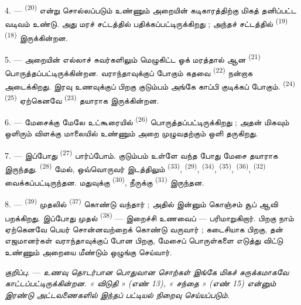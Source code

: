 4. ---  \textsuperscript{(20)} என்று
சொல்லப்படும் உண்ணும் அறையின் கடிகாரத்திற்கு மிகத் தனிப்பட்ட வடிவம்
உண்டு. அது மரச் சட்டத்தில் பதிக்கப்பட்டிருக்கிறது ; அந்தச் சட்டத்தில்
 \textsuperscript{(19)} 
\textsuperscript{(18)} இருக்கின்றன.

\VUsaut{4.6mm}
\VUsaut{3.0mm}

5. --- அறையின் எல்லாச் சுவர்களிலும் மெழுகிட்ட ஓக் மரத்தால் ஆன
 \textsuperscript{(21)} பொருத்தப்பட்டிருக்கின்றன.
வராந்தாவுக்குப் போகும் கதவை  \textsuperscript{(22)}
நன்றாக அடைக்கிறது. இரவு உணவுக்குப் பிறகு குடும்பம் அங்கே காப்பி குடிக்கப்
போகும்.  \textsuperscript{(24)} 
\textsuperscript{(25)} ஏற்கெனவே 
\textsuperscript{(23)} தயாராக இருக்கின்றன.

6. --- மேசைக்கு மேலே உட்கூரையில் 
\textsuperscript{(26)} பொருத்தப்பட்டிருக்கிறது ; அதன் மிகவும் ஒளிரும்
விளக்கு மாலையில் உண்ணும் அறை முழுவதற்கும் ஒளி தருகிறது.

7. --- இப்போது  \textsuperscript{(27)}
பார்ப்போம். குடும்பம் உள்ளே வந்த போது மேசை தயாராக இருந்தது.
 \textsuperscript{(28)} மேல், ஒவ்வொருவர்
இடத்திலும்  \textsuperscript{(33)}, 
\textsuperscript{(29)},  \textsuperscript{(34)},
 \textsuperscript{(35)}, 
\textsuperscript{(36)},  \textsuperscript{(32)}
வைக்கப்பட்டிருந்தன. மதுவுக்கு 
\textsuperscript{(30)}, நீருக்கு 
\textsuperscript{(31)} இருந்தன.

8. ---  \textsuperscript{(39)} முதலில்  \textsuperscript{(37)} கொண்டு வந்தார் ; அதில் இன்னும்
கொஞ்சம் சூப் ஆவி பறக்கிறது. இப்போது முதல் 
\textsuperscript{(38)} — இறைச்சி உணவைப் — பரிமாறுகிறார். பிறகு நாம்
ஏற்கெனவே பெயர் சொன்னவற்றைக் கொண்டு வருவார் ; கடைசியாக
 பிறகு, தன் எஜமானர்கள் வராந்தாவுக்குப்
போன பிறகு, மேசைப் பொருள்களை எடுத்து விட்டு உண்ணும் அறையை மீண்டும்
ஒழுங்கு செய்வார்.

\textit{குறிப்பு.} --- \textit{உணவு தொடர்பான பொதுவான சொற்கள் இங்கே}
\textit{மிகச் சுருக்கமாகவே காட்டப்பட்டிருக்கின்றன. « விடுதி »}
\textit{(எண் 13), « சந்தை » (எண் 15) என்னும் இரண்டு அட்டவணைகளில்}
\textit{இந்தப் பட்டியல் நிறைவு செய்யப்படும்.}

